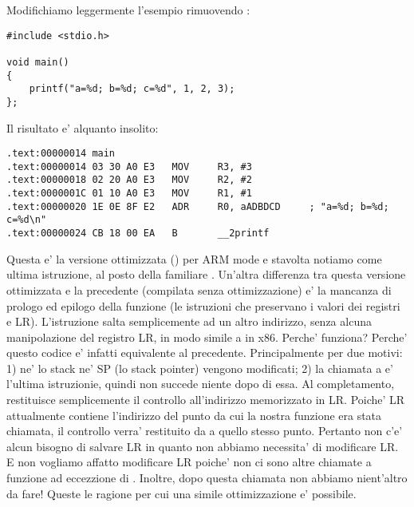 \label{ARM_B_to_printf}

Modifichiamo leggermente l'esempio rimuovendo :

\begin{lstlisting}[style=customc]
#include <stdio.h>

void main()
{
	printf("a=%d; b=%d; c=%d", 1, 2, 3);
};
\end{lstlisting}

Il risultato e' alquanto insolito:

\begin{lstlisting}[caption=\OptimizingKeilVI (\ARMMode),style=customasmARM]
.text:00000014 main
.text:00000014 03 30 A0 E3   MOV     R3, #3
.text:00000018 02 20 A0 E3   MOV     R2, #2
.text:0000001C 01 10 A0 E3   MOV     R1, #1
.text:00000020 1E 0E 8F E2   ADR     R0, aADBDCD     ; "a=%d; b=%d; c=%d\n"
.text:00000024 CB 18 00 EA   B       __2printf
\end{lstlisting}

Questa e' la versione ottimizzata (\Othree) per ARM mode e stavolta notiamo  come ultima istruzione, al posto della familiare .
Un'altra differenza tra questa versione ottimizzata e la precedente (compilata senza ottimizzazione)
e' la mancanza di prologo ed epilogo della funzione (le istruzioni che preservano i valori dei registri  e \ac{LR}).
L'istruzione  salta semplicemente ad un altro indirizzo, senza alcuna manipolazione del registro \ac{LR}, in modo simile
a \JMP in x86.
Perche' funziona? Perche' questo codice e' infatti equivalente al precedente.
Principalmente per due motivi: 1) ne' lo stack ne' \ac{SP} (lo \gls{stack pointer}) vengono modificati;
2) la chiamata a \printf e' l'ultima istruzionie, quindi non succede niente dopo di essa.
Al completamento, \printf restituisce semplicemente il controllo all'indirizzo memorizzato in \ac{LR}.
Poiche' \ac{LR} attualmente contiene l'indirizzo del punto da cui la nostra funzione era stata chiamata, 
il controllo verra' restituito da \printf a quello stesso punto.
Pertanto non c'e' alcun bisogno di salvare \ac{LR} in quanto non abbiamo necessita' di modificare \ac{LR}.
E non vogliamo affatto modificare \ac{LR} poiche' non ci sono altre chiamate a funzione ad eccezzione di \printf. Inoltre, dopo
questa chiamata non abbiamo nient'altro da fare!
Queste le ragione per cui una simile ottimizzazione e' possibile.

